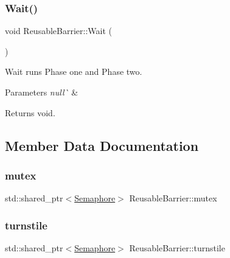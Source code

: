 \subsubsection{\texorpdfstring{Wait()}{Wait()}}
{\footnotesize\ttfamily void Reusable\+Barrier\+::\+Wait (\begin{DoxyParamCaption}{ }\end{DoxyParamCaption})}



Wait runs Phase one and Phase two. 


\begin{DoxyParams}{Parameters}
{\em null\`{}} & \\
\hline
\end{DoxyParams}
\begin{DoxyReturn}{Returns}
void. 
\end{DoxyReturn}


\subsection{Member Data Documentation}
\mbox{\label{class_reusable_barrier_a57c8cdb580366e8516d7af2f55fb3ddb}} 
\subsubsection{\texorpdfstring{mutex}{mutex}}
{\footnotesize\ttfamily std\+::shared\+\_\+ptr$<$\mbox{\hyperlink{class_semaphore}{Semaphore}}$>$ Reusable\+Barrier\+::mutex}

\mbox{\label{class_reusable_barrier_a1fdd613c9544878112266f8f65797570}} 
\subsubsection{\texorpdfstring{turnstile}{turnstile}}
{\footnotesize\ttfamily std\+::shared\+\_\+ptr$<$\mbox{\hyperlink{class_semaphore}{Semaphore}}$>$ Reusable\+Barrier\+::turnstile}

\mbox{\label{class_reusable_barrier_a010da417ee66e6103e57004f9dbe2347}} 
